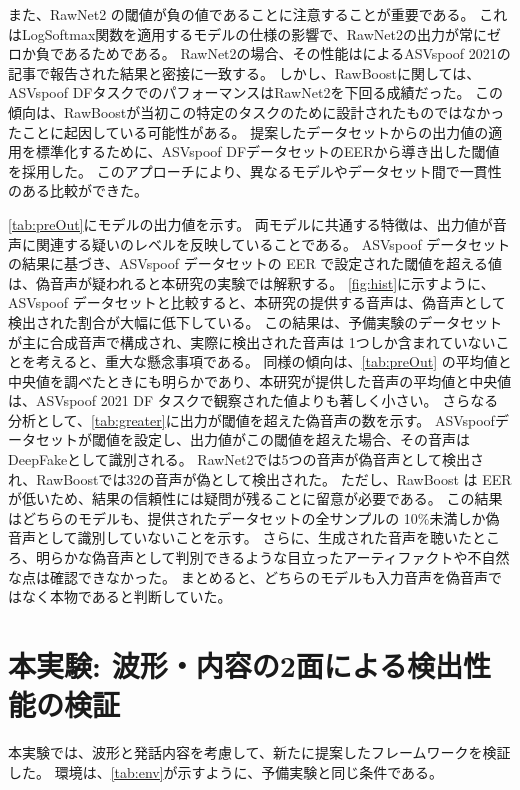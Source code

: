 また、RawNet2 の閾値が負の値であることに注意することが重要である。
これはLogSoftmax関数を適用するモデルの仕様の影響で、RawNet2の出力が常にゼロか負であるためである。
RawNet2の場合、その性能は\cite{yamagishi21_asvspoof}によるASVspoof 2021の記事で報告された結果と密接に一致する。
しかし、RawBoostに関しては、ASVspoof DFタスクでのパフォーマンスはRawNet2を下回る成績だった。
この傾向は、RawBoostが当初この特定のタスクのために設計されたものではなかったことに起因している可能性がある。
提案したデータセットからの出力値の適用を標準化するために、ASVspoof DFデータセットのEERから導き出した閾値を採用した。
このアプローチにより、異なるモデルやデータセット間で一貫性のある比較ができた。

\cref{tab:preOut}にモデルの出力値を示す。
両モデルに共通する特徴は、出力値が音声に関連する疑いのレベルを反映していることである。
ASVspoof データセットの結果に基づき、ASVspoof データセットの EER で設定された閾値を超える値は、偽音声が疑われると本研究の実験では解釈する。
\cref{fig:hist}に示すように、ASVspoof データセットと比較すると、本研究の提供する音声は、偽音声として検出された割合が大幅に低下している。
この結果は、予備実験のデータセットが主に合成音声で構成され、実際に検出された音声は 1つしか含まれていないことを考えると、重大な懸念事項である。
同様の傾向は、\cref{tab:preOut} の平均値と中央値を調べたときにも明らかであり、本研究が提供した音声の平均値と中央値は、ASVspoof 2021 DF タスクで観察された値よりも著しく小さい。
さらなる分析として、\cref{tab:greater}に出力が閾値を超えた偽音声の数を示す。
ASVspoofデータセットが閾値を設定し、出力値がこの閾値を超えた場合、その音声はDeepFakeとして識別される。
RawNet2では5つの音声が偽音声として検出され、RawBoostでは32の音声が偽として検出された。
ただし、RawBoost は EER が低いため、結果の信頼性には疑問が残ることに留意が必要である。
この結果はどちらのモデルも、提供されたデータセットの全サンプルの 10\%未満しか偽音声として識別していないことを示す。
さらに、生成された音声を聴いたところ、明らかな偽音声として判別できるような目立ったアーティファクトや不自然な点は確認できなかった。
まとめると、どちらのモデルも入力音声を偽音声ではなく本物であると判断していた。


\section{本実験: 波形・内容の2面による検出性能の検証}\label{sec:cnt_main}
本実験では、波形と発話内容を考慮して、新たに提案したフレームワークを検証した。
環境は、\ref{tab:env}が示すように、予備実験と同じ条件である。


